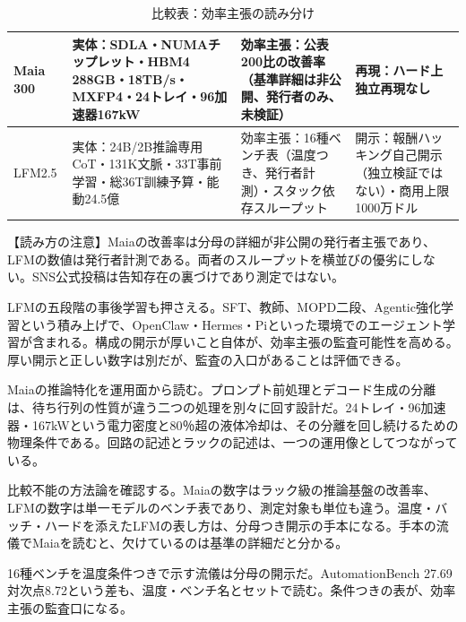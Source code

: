 \documentclass[lualatex,a4paper,10pt]{jlreq}
\begin{document}
\begin{table}[htbp]\centering\footnotesize
\caption{比較表：効率主張の読み分け}
\begin{tabularx}{0.96\linewidth}{@{}lXXX@{}}
\toprule
Maia 300 & 実体：SDLA・NUMAチップレット・HBM4 288GB・18TB/s・MXFP4・24トレイ・96加速器167kW & 効率主張：公表200比の改善率（基準詳細は非公開、発行者のみ、未検証） & 再現：ハード上独立再現なし \cite{B09,B66,B10,B67} \\
\midrule
LFM2.5 & 実体：24B/2B推論専用CoT・131K文脈・33T事前学習・総36T訓練予算・能動24.5億 & 効率主張：16種ベンチ表（温度つき、発行者計測）・スタック依存スループット & 開示：報酬ハッキング自己開示（独立検証ではない）・商用上限1000万ドル \cite{B11,B69,B12} \\
\bottomrule
\end{tabularx}
\end{table}

\begin{tcolorbox}[colback=SurveySoft,colframe=SurveyRule,arc=1mm,boxrule=0.4pt,left=2mm,right=2mm]
【読み方の注意】Maiaの改善率は分母の詳細が非公開の発行者主張であり、LFMの数値は発行者計測である。両者のスループットを横並びの優劣にしない。SNS公式投稿は告知存在の裏づけであり測定ではない。
\end{tcolorbox}
\cite{B09,B66,B10,B67,B68,B11,B69,B12}

LFMの五段階の事後学習も押さえる。SFT、教師、MOPD二段、Agentic強化学習という積み上げで、OpenClaw・Hermes・Piといった環境でのエージェント学習が含まれる。構成の開示が厚いこと自体が、効率主張の監査可能性を高める。厚い開示と正しい数字は別だが、監査の入口があることは評価できる。
\cite{B11,B69,B12}


Maiaの推論特化を運用面から読む。プロンプト前処理とデコード生成の分離は、待ち行列の性質が違う二つの処理を別々に回す設計だ。24トレイ・96加速器・167kWという電力密度と80％超の液体冷却は、その分離を回し続けるための物理条件である。回路の記述とラックの記述は、一つの運用像としてつながっている。
\cite{B09,B66,B10,B67,B68}


比較不能の方法論を確認する。Maiaの数字はラック級の推論基盤の改善率、LFMの数字は単一モデルのベンチ表であり、測定対象も単位も違う。温度・バッチ・ハードを添えたLFMの表し方は、分母つき開示の手本になる。手本の流儀でMaiaを読むと、欠けているのは基準の詳細だと分かる。
\cite{B09,B66,B10,B67,B68,B11,B69,B12}


16種ベンチを温度条件つきで示す流儀は分母の開示だ。AutomationBench 27.69対次点8.72という差も、温度・ベンチ名とセットで読む。条件つきの表が、効率主張の監査口になる。
\cite{B11,B69,B12}
\end{document}
